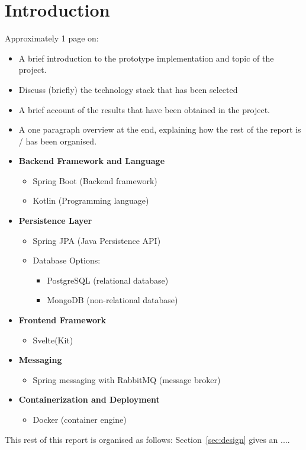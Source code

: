 \section{Introduction}
\label{sec:introduction}

Approximately 1 page on:

\begin{itemize}

\item A brief introduction to the prototype implementation and topic of the project.

\item Discuss (briefly) the technology stack that has been selected

\item A brief account of the results that have been obtained in the project.

\item A one paragraph overview at the end, explaining how the rest of the report is / has been organised.

\end{itemize}

\begin{itemize}
    \item \textbf{Backend Framework and Language}
    \begin{itemize}
        \item Spring Boot (Backend framework)
        \item Kotlin (Programming language)
    \end{itemize}
    
    \item \textbf{Persistence Layer}
    \begin{itemize}
        \item Spring JPA (Java Persistence API)
        \item Database Options:
        \begin{itemize}
            \item PostgreSQL (relational database)
            \item MongoDB (non-relational database)
        \end{itemize}
    \end{itemize}

    \item \textbf{Frontend Framework}
    \begin{itemize}
        \item Svelte(Kit)
    \end{itemize}

    \item \textbf{Messaging}
    \begin{itemize}
        \item Spring messaging with RabbitMQ (message broker)
    \end{itemize}

    \item \textbf{Containerization and Deployment}
    \begin{itemize}
        \item Docker (container engine)
    \end{itemize}
\end{itemize}


\noindent
This rest of this report is organised as follows:
Section~\ref{sec:design} gives an ....
